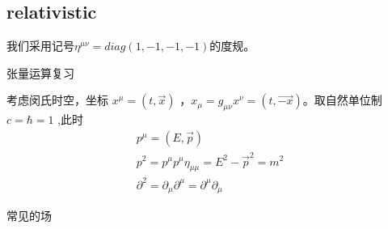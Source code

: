 \subsection{relativistic}

我们采用记号$\eta^{\mu\nu}=diag(1,-1,-1,-1)$的度规。

张量运算复习

考虑闵氏时空，坐标 $x^{\mu}=(t,\vec{x})$ ，$x_{\mu}=g_{\mu\nu}x^{\nu}=(t,\vec{-x})$。取自然单位制 $c=\hbar=1$ ,此时
\begin{equation}
   \begin{array}{lr}
     p^{\mu}=(E,\vec{p})\\
     p^{2}=p^{\mu}p^{\mu}\eta_{\mu\mu}=E^{2}-\vec{p}^{2}=m^{2}\\
     \partial^{2}=\partial_{\mu}\partial^{\mu}=\partial^{\mu}\partial_{\mu}
   \end{array}
\end{equation}




常见的场

